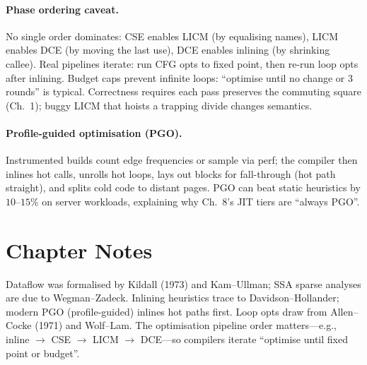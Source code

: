\paragraph{Phase ordering caveat.}
No single order dominates: CSE enables LICM (by equalising names), LICM enables DCE (by moving the last use), DCE enables inlining (by shrinking callee). Real pipelines iterate: run CFG opts to fixed point, then re-run loop opts after inlining. Budget caps prevent infinite loops: ``optimise until no change or 3 rounds'' is typical. Correctness requires each pass preserves the commuting square (Ch.~1); buggy LICM that hoists a trapping divide changes semantics.

\paragraph{Profile-guided optimisation (PGO).}
Instrumented builds count edge frequencies or sample via perf; the compiler then inlines hot calls, unrolls hot loops, lays out blocks for fall-through (hot path straight), and splits cold code to distant pages. PGO can beat static heuristics by $10$--$15\%$ on server workloads, explaining why Ch.~8's JIT tiers are ``always PGO''.

\section{Chapter Notes}
Dataflow was formalised by Kildall (1973) and Kam--Ullman; SSA sparse analyses are due to Wegman--Zadeck. Inlining heuristics trace to Davidson--Hollander; modern PGO (profile-guided) inlines hot paths first. Loop opts draw from Allen--Cocke (1971) and Wolf--Lam. The optimisation pipeline order matters---e.g., inline $\to$ CSE $\to$ LICM $\to$ DCE---so compilers iterate ``optimise until fixed point or budget''.


